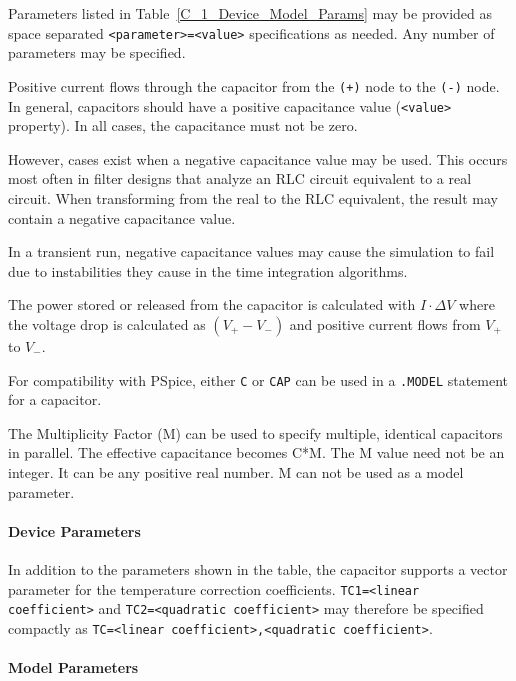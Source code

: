 \begin{Device}
\begin{Parameters}
Parameters listed in Table~\ref{C_1_Device_Model_Params} may be provided as
space separated \texttt{<parameter>=<value>} specifications as needed.  Any number
of parameters may be specified.

\end{Parameters}

\comments
Positive current flows through the capacitor from
the \texttt{(+)} node to the \texttt{(-)} node.  In general, capacitors should
have a positive capacitance value (\texttt{<value>} property). In all cases,
the capacitance must not be zero.  

However, cases exist when a negative capacitance value may be used. This occurs
most often in filter designs that analyze an RLC circuit equivalent to a real
circuit. When transforming from the real to the RLC equivalent, the result may
contain a negative capacitance value.

In a transient run, negative capacitance values may cause the simulation to
fail due to instabilities they cause in the time integration
algorithms.

The power stored or released from the capacitor is calculated 
with $I \cdot \Delta V$ where the voltage drop is calculated as $(V_+ - V_-)$ 
and positive current flows from $V_+$ to $V_-$.

For compatibility with PSpice, either \texttt{C} or \texttt{CAP} can be used in a
\texttt{.MODEL} statement for a capacitor. 

The Multiplicity Factor (M) can be used to specify multiple, identical capacitors
in parallel. The effective capacitance becomes C*M. The M value need not be an
integer. It can be any positive real number. M can not be used as a model
parameter.

\end{Device}

\paragraph{Device Parameters}



In addition to the parameters shown in the table, the capacitor supports a
vector parameter for the temperature correction coefficients.
\texttt{TC1=<linear coefficient>} and \texttt{TC2=<quadratic coefficient>} may
therefore be specified compactly as \texttt{TC=<linear coefficient>,<quadratic
coefficient>}.

\paragraph{Model Parameters}

